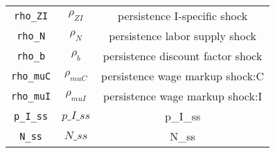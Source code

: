 \begin{center}
\begin{longtable}{ccc}
\texttt{rho\_ZI} & ${\rho_{ZI}}$ & persistence I-specific shock\\
\texttt{rho\_N} & ${\rho_N}$ & persistence labor supply shock\\
\texttt{rho\_b} & ${\rho_b}$ & persistence discount factor shock\\
\texttt{rho\_muC} & ${\rho_{muC}}$ & persistence wage markup shock:C\\
\texttt{rho\_muI} & ${\rho_{muI}}$ & persistence wage markup shock:I\\
\texttt{p\_I\_ss} & $p\_I\_ss$ & p\_I\_ss\\
\texttt{N\_ss} & $N\_ss$ & N\_ss\\
\hline%
\end{longtable}
\end{center}
